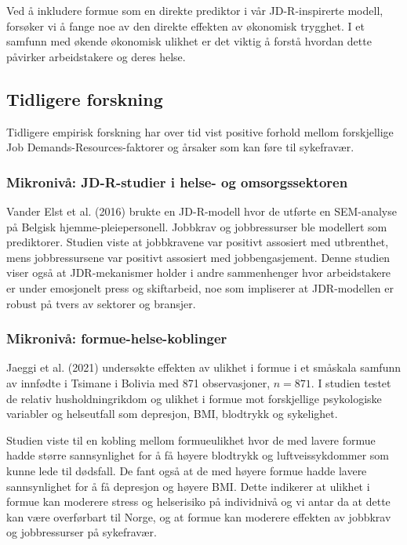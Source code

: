 \documentclass[
  12pt,
  a4paper,
  DIV=11,
  numbers=noendperiod]{scrartcl}
\begin{document}
Ved å inkludere formue som en direkte prediktor i vår JD-R-inspirerte
modell, forsøker vi å fange noe av den direkte effekten av økonomisk
trygghet. I et samfunn med økende økonomisk ulikhet er det viktig å
forstå hvordan dette påvirker arbeidstakere og deres helse.

\subsection{Tidligere forskning}\label{tidligere-forskning}

Tidligere empirisk forskning har over tid vist positive forhold mellom
forskjellige Job Demands-Resources-faktorer og årsaker som kan føre til
sykefravær.

\subsubsection{Mikronivå: JD-R-studier i helse- og
omsorgssektoren}\label{mikronivuxe5-jd-r-studier-i-helse--og-omsorgssektoren}

Vander Elst et al. (2016) brukte en JD-R-modell hvor de utførte en
SEM-analyse på Belgisk hjemme-pleiepersonell. Jobbkrav og jobbressurser
ble modellert som prediktorer. Studien viste at jobbkravene var positivt
assosiert med utbrenthet, mens jobbressursene var positivt assosiert med
jobbengasjement. Denne studien viser også at JDR-mekanismer holder i
andre sammenhenger hvor arbeidstakere er under emosjonelt press og
skiftarbeid, noe som impliserer at JDR-modellen er robust på tvers av
sektorer og bransjer.

\subsubsection{Mikronivå:
formue-helse-koblinger}\label{mikronivuxe5-formue-helse-koblinger}

Jaeggi et al. (2021) undersøkte effekten av ulikhet i formue i et
småskala samfunn av innfødte i Tsimane i Bolivia med 871 observasjoner,
\(n = 871\). I studien testet de relativ husholdningrikdom og ulikhet i
formue mot forskjellige psykologiske variabler og helseutfall som
depresjon, BMI, blodtrykk og sykelighet.

Studien viste til en kobling mellom formueulikhet hvor de med lavere
formue hadde større sannsynlighet for å få høyere blodtrykk og
luftveissykdommer som kunne lede til dødsfall. De fant også at de med
høyere formue hadde lavere sannsynlighet for å få depresjon og høyere
BMI. Dette indikerer at ulikhet i formue kan moderere stress og
helserisiko på individnivå og vi antar da at dette kan være overførbart
til Norge, og at formue kan moderere effekten av jobbkrav og
jobbressurser på sykefravær.
\end{document}
